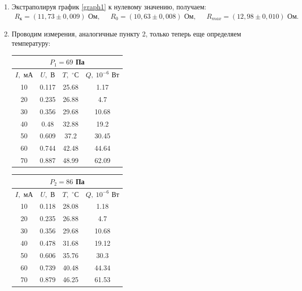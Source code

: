\documentclass[a4paper,12pt]{article}
\theoremstyle{definition}
\begin{document}
\begin{enumerate}
	\item Экстраполируя график \eqref{graph1} к нулевому значению, получаем:
	\begin{align*}
		R_{к} = (11,73 \pm 0,009)\text{ Ом,} && R_0 = (10,63\pm0,008)\text{ Ом,} && R_{max} = (12,98\pm0,010)\text{ Ом.}
	\end{align*}
	\item Проводим измерения, аналогичные пункту 2, только теперь  еще определяем температуру:
	\begin{table}[H]
		\centering
		\begin{minipage}{.49\linewidth}
			\centering
			\begin{tabular}{|c|c|c|c|}
				\hline
				\multicolumn{4}{|c|}{$P_1 = 69$ Па}\\
				\hline
				$I,$ мА & $U,$ В& $T,$ $^\circ$С & $Q,\: 10^{-6}$ Вт \\ \hline
				10 & 0.117 & 25.68 & 1.17 \\ \hline
				20 & 0.235 & 26.88 & 4.7 \\ \hline
				30 & 0.356 & 29.68 & 10.68 \\ \hline
				40 & 0.48 & 32.88 & 19.2 \\ \hline
				50 & 0.609 & 37.2 & 30.45 \\ \hline
				60 & 0.744 & 42.48 & 44.64 \\ \hline
				70 & 0.887 & 48.99 & 62.09 \\ \hline
			\end{tabular}
		\end{minipage}
		\begin{minipage}{.49\linewidth}
			\centering
			\begin{tabular}{|c|c|c|c|}
				\hline
				\multicolumn{4}{|c|}{$P_2 = 86$ Па}\\
				\hline
				$I,$ мА & $U,$ В& $T,$ $^\circ$С & $Q,\: 10^{-6}$ Вт \\ \hline
				10 & 0.118 & 28.08 & 1.18 \\ \hline
				20 & 0.235 & 26.88 & 4.7 \\ \hline
				30 & 0.356 & 29.68 & 10.68 \\ \hline
				40 & 0.478 & 31.68 & 19.12 \\ \hline
				50 & 0.606 & 35.76 & 30.3 \\ \hline
				60 & 0.739 & 40.48 & 44.34 \\ \hline
				70 & 0.879 & 46.25 & 61.53 \\ \hline
			\end{tabular}
		\end{minipage}
		

\end{table}
\end{enumerate}
\end{document}
